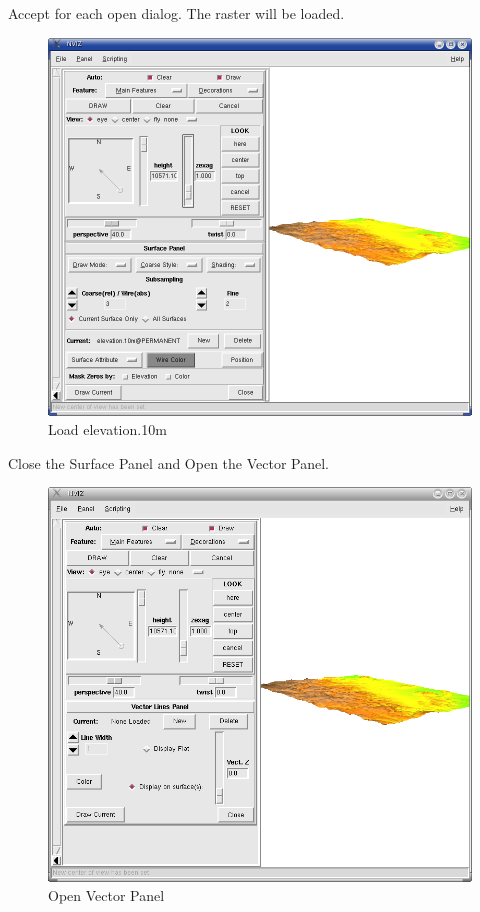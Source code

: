 Accept for each open dialog. The raster will be loaded.

\begin{figure}[htbp]
   \centering
   \includegraphics[scale=0.2]{nviz006.png}
   \caption{Load elevation.10m}
   \label{fig:nviz006}
\end{figure}

Close the Surface Panel and Open the Vector Panel.

\begin{figure}[htbp]
   \centering
   \includegraphics[scale=0.2]{nviz007.png}
   \caption{Open Vector Panel}
   \label{fig:nviz007}
\end{figure}

